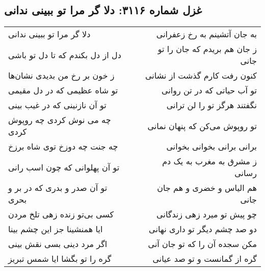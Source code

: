 \begin{center}
\section*{غزل شماره ۳۱۱۶: دلا گر مرا تو ببینی ندانی}
\label{sec:3116}
\begin{longtable}{l p{0.5cm} r}
دلا گر مرا تو ببینی ندانی
&&
به جان آتشینم به رخ زعفرانی
\\
دل از دل بکندم که تا دل تو باشی
&&
ز جان هم بریدم که جان را تو جانی
\\
ز خون بر رخ من بدیدی نشان‌ها
&&
کنون رفت کارم گذشت از نشانی
\\
تو شاه عظیمی که در دل مقیمی
&&
تو آب حیاتی که در تن روانی
\\
تو آن نازنینی که در غیب بینی
&&
نگفتند هرگز تو را لن ترانی
\\
چه می نوش کردی چه روپوش کردی
&&
تو روپوش می‌کن که پنهان نمانی
\\
چه جنت چه دوزخ توی شاه برزخ
&&
برانی برانی بخوانی بخوانی
\\
تو آن پهلوانی که چون اسب رانی
&&
ز مشرق به مغرب به یک دم رسانی
\\
تو آن صدر و بدری که در بر و بحری
&&
هم الیاس و خضری و هم جان جانی
\\
کسی بی‌تو زنده زهی تلخ مردن
&&
چو پیش تو میرد زهی زندگانی
\\
ایا همنشینا جز این چشم بینا
&&
دو صد چشم دیگر تو داری نهانی
\\
اگر مرد دینی بسی نقش بینی
&&
مکن سجده آن را که تو جان آنی
\\
گره را تو بگشا ایا شمس تبریز
&&
گره از گمانست و تو صد عیانی
\\
\end{longtable}
\end{center}
